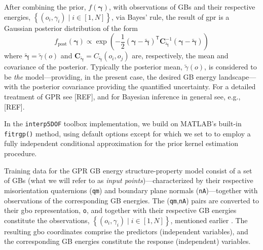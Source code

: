 \documentclass[final,twocolumn,12pt]{elsarticle}
\begin{document}
	After combining the prior, $f\!\left(\boldsymbol{\gamma}\right)$, with observations of GBs and their respective energies, $\left\{\left(o_i,\gamma_i\right) \mid i \in \left[1,N\right]\right\}$, via Bayes' rule, the result of \gls{gpr} is a Gaussian posterior distribution of the form
	\begin{equation}
	    f_{\text{post}}\!\left(\boldsymbol{\gamma}\right) \propto \exp{\left(-\frac{1}{2} {\left(\boldsymbol{\gamma}-\widetilde{\boldsymbol{\gamma}}\right)}^{\mathsf{T}} \mathbf{C}_{\widetilde{\boldsymbol{\gamma}}}^{-1} {\left(\boldsymbol{\gamma}-\widetilde{\boldsymbol{\gamma}}\right)}\right)}
	\end{equation}
	where $\widetilde{\boldsymbol{\gamma}} = \widetilde{\gamma}(o)$ and $\mathbf{C}_{\widetilde{\boldsymbol{\gamma}}} = C_{\widetilde{\boldsymbol{\gamma}}}\!\left(o_i,o_j\right)$ are, respectively, the mean and covariance of the posterior. Typically the posterior mean, $\widetilde{\gamma}(o)$, is considered to be \emph{the} model---providing, in the present case, the desired GB energy landscape---with the posterior covariance providing the quantified uncertainty. For a detailed treatment of GPR see [REF], and for Bayesian inference in general see, e.g., [REF]. 
	
	In the \texttt{interp5DOF} toolbox implementation, we build on MATLAB's built-in \texttt{fitrgp()} method, using default options except for  which we set to  to employ a fully independent conditional approximation for the prior kernel estimation procedure.
	
	Training data for the GPR GB energy structure-property model consist of a set of GBs (what we will refer to as \emph{input points})---characterized by their respective misorientation quaternions (\texttt{qm}) and boundary plane normals (\texttt{nA})---together with observations of the corresponding GB energies. The (\texttt{qm},\texttt{nA}) pairs are converted to their \gls{gbo} representation, \texttt{o}, and together with their respective GB energies constitute the observations, $\left\{\left(o_i,\gamma_i\right) \mid i \in \left[1,N\right]\right\}$, mentioned earlier . The resulting \gls{gbo} coordinates comprise the predictors (independent variables), and the corresponding GB energies constitute the response (independent) variables.
	
\end{document}
